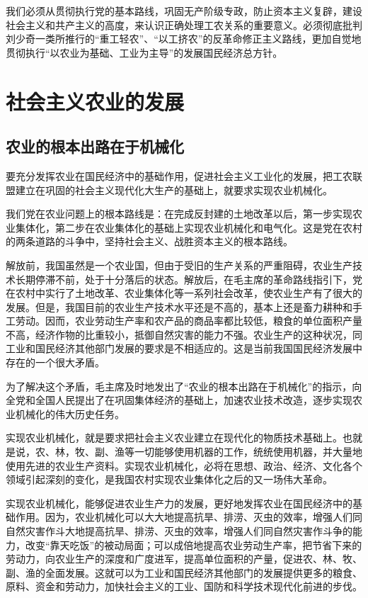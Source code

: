 \documentclass{book}
\begin{document}
我们必须从贯彻执行党的基本路线，巩固无产阶级专政，防止资本主义复辟，建设社会主义和共产主义的高度，来认识正确处理工农关系的重要意义。必须彻底批判刘少奇一类所推行的“重工轻农”、“以工挤农”的反革命修正主义路线，更加自觉地贯彻执行“以农业为基础、工业为主导”的发展国民经济总方针。

\section{社会主义农业的发展}

\subsection{农业的根本出路在于机械化}

要充分发挥农业在国民经济中的基础作用，促进社会主义工业化的发展，把工农联盟建立在巩固的社会主义现代化大生产的基础上，就要求实现农业机械化。

我们党在农业问题上的根本路线是：在完成反封建的土地改革以后，第一步实现农业集体化，第二步在农业集体化的基础上实现农业机械化和电气化。这是党在农村的两条道路的斗争中，坚持社会主义、战胜资本主义的根本路线。

解放前，我国虽然是一个农业国，但由于受旧的生产关系的严重阻碍，农业生产技术长期停滞不前，处于十分落后的状态。解放后，在毛主席的革命路线指引下，党在农村中实行了土地改革、农业集体化等一系列社会改革，使农业生产有了很大的发展。但是，我国目前的农业生产技术水平还是不高的，基本上还是畜力耕种和手工劳动。因而，农业劳动生产率和农产品的商品率都比较低，粮食的单位面积产量不高，经济作物的比重较小，抵御自然灾害的能力不强。农业生产的这种状况，同工业和国民经济其他部门发展的要求是不相适应的。这是当前我国国民经济发展中存在的一个很大矛盾。

为了解决这个矛盾，毛主席及时地发出了“农业的根本出路在于机械化”的指示，向全党和全国人民提出了在巩固集体经济的基础上，加速农业技术改造，逐步实现农业机械化的伟大历史任务。

实现农业机械化，就是要求把社会主义农业建立在现代化的物质技术基础上。也就是说，农、林，牧、副、渔等一切能够使用机器的工作，统统使用机器，并大量地使用先进的农业生产资料。实现农业机械化，必将在思想、政治、经济、文化各个领域引起深刻的变化，是我国农村实现农业集体化之后的又一场伟大革命。

实现农业机械化，能够促进农业生产力的发展，更好地发挥农业在国民经济中的基础作用。因为，农业机械化可以大大地提高抗旱、排涝、灭虫的效率，增强人们同自然灾害作斗大地提高抗旱、排涝、灭虫的效率，增强人们同自然灾害作斗争的能力，改变“靠天吃饭”的被动局面；可以成倍地提高农业劳动生产率，把节省下来的劳动力，向农业生产的深度和广度进军，提高单位面积的产量，促进农、林、牧、副、渔的全面发展。这就可以为工业和国民经济其他部门的发展提供更多的粮食、原料、资金和劳动力，加快社会主义的工业、国防和科学技术现代化前进的步伐。
\end{document}
